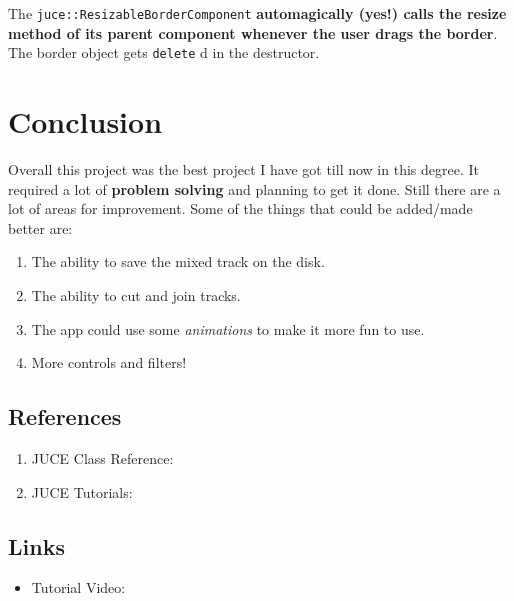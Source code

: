 \documentclass[12pt,]{article}
\providecommand{\tightlist}{%
  \setlength{\itemsep}{0pt}\setlength{\parskip}{0pt}}
\let\oldtexttt\texttt
\renewcommand{\texttt}[1]{
  \colorbox{bgcolor}{\oldtexttt{#1}}
}
\begin{document}
The \texttt{juce::ResizableBorderComponent} \textbf{automagically (yes!)
calls the resize method of its parent component whenever the user drags
the border}. The border object gets \texttt{delete}d in the destructor.

\hypertarget{conclusion}{%
\section{Conclusion}\label{conclusion}}

Overall this project was the best project I have got till now in this
degree. It required a lot of \textbf{problem solving} and planning to
get it done. Still there are a lot of areas for improvement. Some of the
things that could be added/made better are:

\begin{enumerate}
\def\labelenumi{\arabic{enumi}.}
\tightlist
\item
  The ability to save the mixed track on the disk.
\item
  The ability to cut and join tracks.
\item
  The app could use some \emph{animations} to make it more fun to use.
\item
  More controls and filters!
\end{enumerate}

\hypertarget{references}{%
\subsection{References}\label{references}}

\begin{enumerate}
\def\labelenumi{\arabic{enumi}.}
\item
  JUCE Class Reference:
\item
  JUCE Tutorials:
\end{enumerate}

\hypertarget{links}{%
\subsection{Links}\label{links}}

\begin{itemize}
\tightlist
\item
  Tutorial Video:
\end{itemize}
\end{document}
